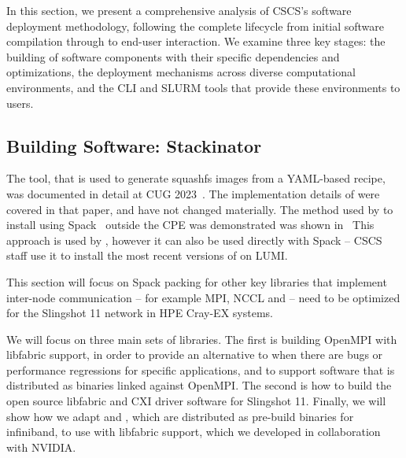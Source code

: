 In this section, we present a comprehensive analysis of CSCS's software deployment methodology, following the complete lifecycle from initial software compilation through to end-user interaction.
We examine three key stages: the building of software components with their specific dependencies and optimizations, the deployment mechanisms across diverse computational environments, and the CLI and SLURM tools that provide these environments to users.

\subsection{Building Software: Stackinator}

The  \stackinator tool, that is used to generate squashfs images from a YAML-based recipe, was documented in detail at CUG 2023~\cite{uenv2023}.
The implementation details of \stackinator were covered in that paper, and have not changed materially.
The method used by \stackinator to install \craympich using Spack~\cite{gamblin:sc15} outside the CPE was demonstrated was shown in~\cite{uenv2023} 
This approach is used by \stackinator, however it can also be used directly with Spack -- CSCS staff use it to install the most recent versions of \craympich on LUMI.






This section will focus on Spack packing for other key libraries that implement inter-node communication -- for example MPI, NCCL and \nvshmem -- need to be optimized for the Slingshot 11 network in HPE Cray-EX systems.

We will focus on three main sets of libraries. The first is building OpenMPI with libfabric support, in order to provide an alternative to \craympich when there are bugs or performance regressions for specific applications, and to support software that is distributed as binaries linked against OpenMPI. The second is how to build the open source libfabric and CXI driver software for Slingshot 11. Finally, we will show how we adapt \cufftmp and \cusolvermp, which are distributed as pre-build binaries for infiniband, to use \nvshmem with libfabric support, which we developed in collaboration with NVIDIA.

